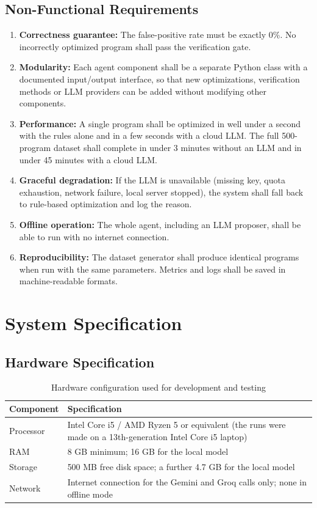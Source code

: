 \documentclass[12pt,a4paper]{report}
\begin{document}
\subsection{Non-Functional Requirements}

\begin{enumerate}[leftmargin=2cm]
  \item \textbf{Correctness guarantee:} The false-positive rate must be exactly 0\%. No incorrectly optimized program shall pass the verification gate.
  \item \textbf{Modularity:} Each agent component shall be a separate Python class with a documented input/output interface, so that new optimizations, verification methods or LLM providers can be added without modifying other components.
  \item \textbf{Performance:} A single program shall be optimized in well under a second with the rules alone and in a few seconds with a cloud LLM. The full 500-program dataset shall complete in under 3 minutes without an LLM and in under 45 minutes with a cloud LLM.
  \item \textbf{Graceful degradation:} If the LLM is unavailable (missing key, quota exhaustion, network failure, local server stopped), the system shall fall back to rule-based optimization and log the reason.
  \item \textbf{Offline operation:} The whole agent, including an LLM proposer, shall be able to run with no internet connection.
  \item \textbf{Reproducibility:} The dataset generator shall produce identical programs when run with the same parameters. Metrics and logs shall be saved in machine-readable formats.
\end{enumerate}

\section{System Specification}

\subsection{Hardware Specification}

\begin{table}[H]
\centering
\caption{Hardware configuration used for development and testing}
\label{tab:hardware}
\begin{tabularx}{\textwidth}{|l|X|}
\hline
\textbf{Component} & \textbf{Specification} \\
\hline
Processor & Intel Core i5 / AMD Ryzen 5 or equivalent (the runs were made on a 13th-generation Intel Core i5 laptop) \\
\hline
RAM & 8 GB minimum; 16 GB for the local model \\
\hline
Storage & 500 MB free disk space; a further 4.7 GB for the local model \\
\hline
Network & Internet connection for the Gemini and Groq calls only; none in offline mode \\
\hline
\end{tabularx}
\end{table}
\end{document}
